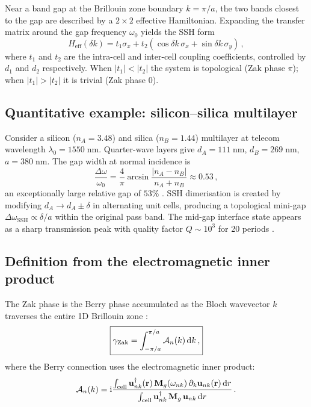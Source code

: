 Near a band gap at the Brillouin zone boundary $k=\pi/a$, the two
bands closest to the gap are described by a $2\times 2$ effective
Hamiltonian.  Expanding the transfer matrix around the gap frequency
$\omega_0$ yields the SSH form
\begin{equation}\label{eq:ch14-ssh-effective}
  H_{\mathrm{eff}}(\delta k)
  = t_1\sigma_x + t_2(\cos\delta k\,\sigma_x
  + \sin\delta k\,\sigma_y)\,,
\end{equation}
where $t_1$ and $t_2$ are the intra-cell and inter-cell coupling
coefficients, controlled by $d_1$ and $d_2$ respectively.  When
$|t_1|<|t_2|$ the system is topological (Zak phase $\pi$); when
$|t_1|>|t_2|$ it is trivial (Zak phase $0$).

\subsection{Quantitative example: silicon--silica multilayer}
\label{sec:ch14-quantitative}

Consider a silicon ($n_A=3.48$) and silica ($n_B=1.44$) multilayer at
telecom wavelength $\lambda_0=1550\;\mathrm{nm}$.  Quarter-wave layers
give $d_A=111\;\mathrm{nm}$, $d_B=269\;\mathrm{nm}$,
$a=380\;\mathrm{nm}$.  The gap width at normal incidence is
\begin{equation}\label{eq:ch14-gap-width}
  \frac{\Delta\omega}{\omega_0}
  = \frac{4}{\pi}\arcsin\frac{|n_A-n_B|}{n_A+n_B}
  \approx 0.53\,,
\end{equation}
an exceptionally large relative gap of $53\%$
\cite{ozawa2018topological}.  SSH dimerisation is created by
modifying $d_A\to d_A\pm\delta$ in alternating unit cells, producing
a topological mini-gap $\Delta\omega_{\mathrm{SSH}}\propto\delta/a$
within the original pass band.  The mid-gap interface state appears
as a sharp transmission peak with quality factor
$Q\sim 10^3$ for 20 periods \cite{price2022roadmap}.

\subsection{Definition from the electromagnetic inner product}
\label{sec:ch14-zak-def}

The Zak phase is the Berry phase accumulated as the Bloch wavevector $k$
traverses the entire 1D Brillouin zone
\cite{ozawa2018topological,gangaraj2016berry}:
\begin{equation}\label{eq:ch14-zak}
  \boxed{%
  \Zak = \int_{-\pi/a}^{\pi/a}
  \Aberry_n(k)\,\dd k\,,}
\end{equation}
where the Berry connection uses the electromagnetic inner product:
\begin{equation}\label{eq:ch14-berry-connection-1d}
  \mathcal{A}_n(k) = \mathrm{i}\frac{\int_{\mathrm{cell}}
  \mathbf{u}_{nk}^\dagger(\mathbf{r})\,\mathbf{M}_g(\omega_{nk})\,
  \partial_k\mathbf{u}_{nk}(\mathbf{r})\,\mathrm{d} r}
  {\int_{\mathrm{cell}}\mathbf{u}_{nk}^\dagger\,\mathbf{M}_g\,
  \mathbf{u}_{nk}\,\mathrm{d} r}\,.
\end{equation}

